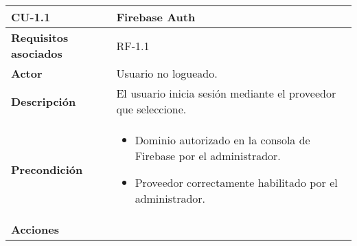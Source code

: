 \begin{longtable}[H]{@{}l|l@{}}
	\toprule
	\begin{minipage}[b]{0.23\columnwidth}\raggedright\strut
		\textbf{CU-1.1}\strut
	\end{minipage} & \begin{minipage}[b]{0.71\columnwidth}\raggedright\strut
		\textbf{Firebase Auth}\strut
	\end{minipage}\tabularnewline
	\toprule
	\endhead
	\begin{minipage}[t]{0.23\columnwidth}\raggedright\strut
		\textbf{Requisitos asociados}\strut
	\end{minipage} & \begin{minipage}[t]{0.71\columnwidth}\raggedright\strut
		RF-1.1\strut
	\end{minipage}\tabularnewline
	\midrule
	\begin{minipage}[t]{0.23\columnwidth}\raggedright\strut
		\textbf{Actor}\strut
	\end{minipage} & \begin{minipage}[t]{0.71\columnwidth}\raggedright\strut
		Usuario no logueado.\strut
	\end{minipage}\tabularnewline
	\midrule
	\begin{minipage}[t]{0.23\columnwidth}\raggedright\strut
		\textbf{Descripción}\strut
	\end{minipage} & \begin{minipage}[t]{0.71\columnwidth}\raggedright\strut
		El usuario inicia sesión mediante el proveedor que seleccione.\strut
	\end{minipage}\tabularnewline
	\midrule
	\begin{minipage}[t]{0.23\columnwidth}\raggedright\strut
		\textbf{Precondición}\strut
	\end{minipage} & \begin{minipage}[t]{0.71\columnwidth}\raggedright\strut
		\begin{itemize}
			\item Dominio autorizado en la consola de Firebase por el administrador.
			\item Proveedor correctamente habilitado por el administrador.
		\end{itemize}
	\end{minipage}\tabularnewline
	\midrule
	\begin{minipage}[t]{0.23\columnwidth}\raggedright\strut
		\textbf{Acciones}\strut
	\end{minipage} & \begin{minipage}[t]{0.71\columnwidth}\raggedright

\end{minipage}
\end{longtable}
